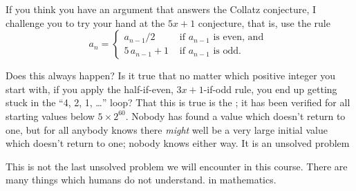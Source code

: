\documentclass{ximera}
\begin{document}
If you think you have an argument that answers the Collatz conjecture, I challenge you to try your hand at the $5x+1$ conjecture, that is, use the rule
\[
a_n = \displaystyle\begin{cases} a_{n-1} / 2 & \text{ if $a_{n-1}$ is even, and } \\
5 \, a_{n-1} + 1 & \text{ if $a_{n-1}$ is odd.}
\end{cases}
\]

Does this always happen?  Is it true that no matter which positive
integer you start with, if you apply the half-if-even, $3x+1$-if-odd
rule, you end up getting stuck in the ``4, 2, 1, \ldots'' loop?  That
this is true is the ; it has been
verified for all starting values below $5 \times 2^{60}$.  Nobody has
found a value which doesn't return to one, but for all anybody knows
there \textit{might} well be a very large initial value which doesn't
return to one; nobody knows either way.  It is an unsolved
problem


This is not the last unsolved problem we will
  encounter in this course.  There are many things which humans do not
  understand. in mathematics.
\end{document}
